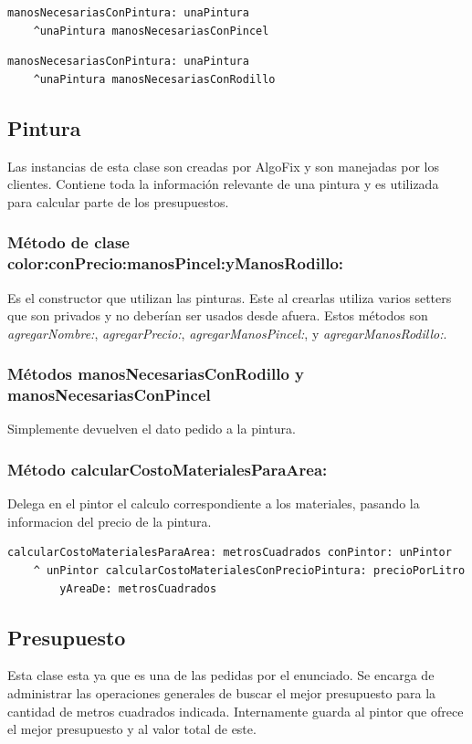 \documentclass[titlepage,a4paper]{article}
\begin{document}
\begin{verbatim}
manosNecesariasConPintura: unaPintura
    ^unaPintura manosNecesariasConPincel
\end{verbatim}

\begin{verbatim}
manosNecesariasConPintura: unaPintura
    ^unaPintura manosNecesariasConRodillo
\end{verbatim}


\subsection{Pintura}
\indent Las instancias de esta clase son creadas por AlgoFix y son manejadas por los clientes. Contiene toda la información relevante de una pintura y es utilizada para calcular parte de los presupuestos.


\subsubsection*{Método de clase color:conPrecio:manosPincel:yManosRodillo:}
\indent Es el constructor que utilizan las pinturas. Este al crearlas utiliza varios setters que son privados y no deberían ser usados desde afuera. Estos métodos son \emph{agregarNombre:}, \emph{agregarPrecio:}, \emph{agregarManosPincel:}, y \emph{agregarManosRodillo:}.

\medskip

\subsubsection*{Métodos manosNecesariasConRodillo y manosNecesariasConPincel}
Simplemente devuelven el dato pedido a la pintura.


\medskip

\subsubsection*{Método calcularCostoMaterialesParaArea:}
Delega en el pintor el calculo correspondiente a los materiales, pasando la informacion del precio de la pintura.
\begin{verbatim}
calcularCostoMaterialesParaArea: metrosCuadrados conPintor: unPintor
    ^ unPintor calcularCostoMaterialesConPrecioPintura: precioPorLitro
        yAreaDe: metrosCuadrados     
\end{verbatim}

\subsection{Presupuesto}
\indent Esta clase esta ya que es una de las pedidas por el enunciado. Se encarga de administrar las operaciones generales de buscar el mejor presupuesto para la cantidad de metros cuadrados indicada. Internamente guarda al pintor que ofrece el mejor presupuesto y al valor total de este.
\end{document}
